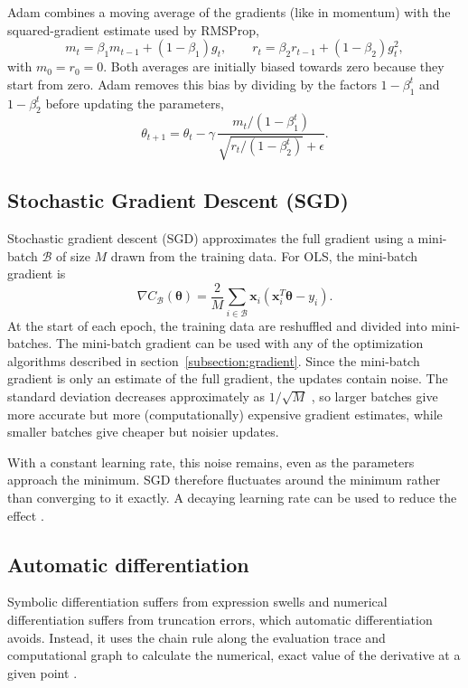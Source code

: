 \documentclass[amssymb,twocolumn,aps]{revtex4}
\begin{document}
Adam combines a moving average of the gradients (like in momentum) with the squared-gradient estimate used by RMSProp,
\[
    m_t = \beta_1 m_{t-1} + (1-\beta_1)g_t,
    \qquad
    r_t = \beta_2 r_{t-1} + (1-\beta_2)g_t^2,
\]
with $m_0=r_0=0$. Both averages are initially biased towards zero because they start from zero. Adam removes this bias by dividing by the factors $1-\beta_1^t$ and $1-\beta_2^t$ before updating the parameters,
\[
    \theta_{t+1} = \theta_t - \gamma\,
    \frac{m_t/(1-\beta_1^t)}{\sqrt{r_t/(1-\beta_2^t)}+\epsilon}.
\]

\subsection{Stochastic Gradient Descent (SGD)}
Stochastic gradient descent (SGD) approximates the full gradient using a mini-batch $\mathcal{B}$ of size $M$ drawn from the training data. For OLS, the mini-batch gradient is
\[
    \nabla C_{\mathcal{B}}(\boldsymbol{\theta})
    =
    \frac{2}{M}\sum_{i\in\mathcal{B}}\boldsymbol{x}_i\left(\boldsymbol{x}_i^T\boldsymbol{\theta}-y_i\right).
\]
At the start of each epoch, the training data are reshuffled and divided into mini-batches. The mini-batch gradient can be used with any of the optimization algorithms described in section~\ref{subsection:gradient}. Since the mini-batch gradient is only an estimate of the full gradient, the updates contain noise. The standard deviation decreases approximately as $1/\sqrt{M}$ \cite{lecturebook}, so larger batches give more accurate but more (computationally) expensive gradient estimates, while smaller batches give cheaper but noisier updates.

With a constant learning rate, this noise remains, even as the parameters approach the minimum. SGD therefore fluctuates around the minimum rather than converging to it exactly. A decaying learning rate can be used to reduce the effect \cite{lecturebook}.

\subsection{Automatic differentiation}
Symbolic differentiation suffers from expression swells and numerical differentiation suffers from truncation errors, which automatic differentiation avoids. Instead, it uses the chain rule along the evaluation trace and computational graph to calculate the numerical, exact value of the derivative at a given point \cite{lecturebook}.
\end{document}
